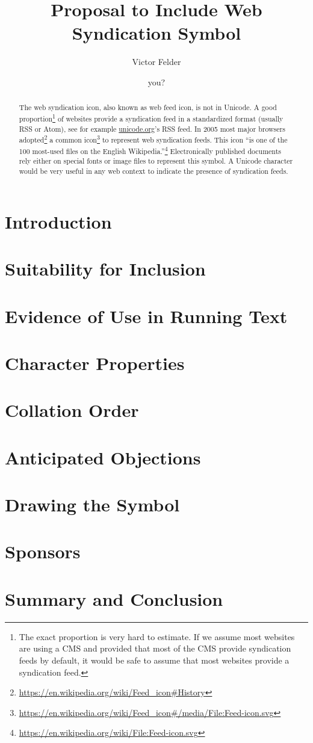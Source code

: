 \documentclass[10pt,a4paper,oneside,draft]{article}
\author{Victor Felder \and you?}
\title{Proposal to Include Web Syndication Symbol}
\begin{document}
\maketitle

\begin{abstract}
The web syndication icon, also known as web feed icon, is not in Unicode. A good proportion\footnote{The exact proportion is very hard to estimate. If we assume most websites are using a CMS and provided that most of the CMS provide syndication feeds by default, it would be safe to assume that most websites provide a syndication feed.} of websites provide a syndication feed in a standardized format (usually RSS or Atom), see for example \href{http://unicode.org}{unicode.org}'s RSS feed. In 2005 most major browsers adopted\footnote{\url{https://en.wikipedia.org/wiki/Feed_icon\#History}} a common icon\footnote{\url{https://en.wikipedia.org/wiki/Feed_icon\#/media/File:Feed-icon.svg}} to represent web syndication feeds. This icon “is one of the 100 most-used files on the English Wikipedia.”\footnote{\url{https://en.wikipedia.org/wiki/File:Feed-icon.svg}} Electronically published documents rely either on special fonts or image files to represent this symbol. A Unicode character would be very useful in any web context to indicate the presence of syndication feeds.
\end{abstract}

\section{Introduction}
\section{Suitability for Inclusion}
\section{Evidence of Use in Running Text}
\section{Character Properties}
\section{Collation Order}
\section{Anticipated Objections}
\section{Drawing the Symbol}
\section{Sponsors}
\section{Summary and Conclusion}
\end{document}
